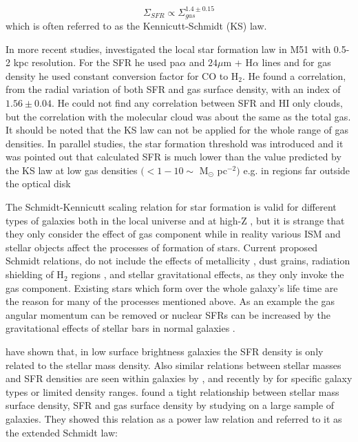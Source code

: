 \begin{equation}
\Sigma_{SFR} \propto \Sigma_{gas}^{1.4\pm0.15}
\end{equation}
which is often referred to as the Kennicutt-Schmidt (KS) law. 

In more recent studies, \cite{Kennicutt08} investigated the local star formation law in M51 with 0.5-2 kpc resolution. For the SFR he used pa${\alpha}$ and $24\mu$m + H${\alpha}$ lines and for gas density he used constant conversion factor for CO to H$_2$. He found a correlation, from the radial variation of both SFR and gas surface density, with an index of $1.56 \pm 0.04$. He could not find any correlation between SFR and HI only clouds, but the correlation with the molecular cloud was about the same as the total gas.
It should be noted that the KS law can not be applied for the whole range of gas densities. In parallel studies, the star formation threshold was introduced and it was pointed out that calculated SFR is much lower than the value predicted by the KS law at low gas densities $( < 1-10\sim$ M$_{\odot}$ pc$^{-2})$ e.g. in regions far outside the optical disk \citep[e.g.,][]{Martin01, Bigiel08}

The Schmidt-Kennicutt scaling relation for star formation is valid for different types of galaxies both in the local universe \citep[e.g.,][]{Kennicutt98a, Bigiel08} and at high-Z \citep[e.g.,][]{Genzel10}, but it is strange that they only consider the effect of gas component while in reality various ISM and stellar objects affect the processes of formation of stars. Current proposed Schmidt relations, do not include the effects of metallicity \citep{Gnedin10}, dust grains, radiation shielding of H$_2$ regions \citep[for a review, see][]{Hollenbach99}, and stellar gravitational effects, as they only invoke the gas component.  Existing stars which form over the whole galaxy's life time are the reason for many of the processes mentioned above. As an example the gas angular momentum can be removed or nuclear SFRs can be increased by the gravitational effects of stellar bars in normal galaxies \citep[e.g.,][]{Sersic67}.  

\cite{Hunter98} have shown that, in low surface brightness galaxies the SFR density is only related to the stellar mass density. Also similar relations between stellar masses and SFR densities are seen within galaxies by \cite{Ryder94}, \cite{Hunter04} and recently by \cite{Leroy08} for specific galaxy types or limited density ranges. \cite{Shi11} found a tight relationship between stellar mass surface density, SFR and gas surface density by studying on a large sample of galaxies. They showed this relation as a power law relation and referred to it as the extended Schmidt law: 


